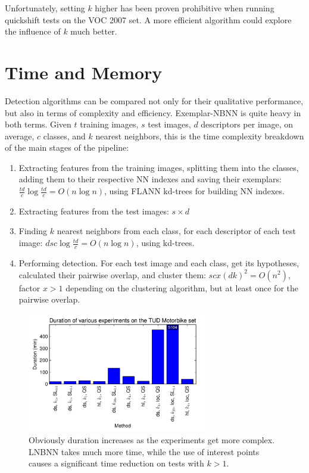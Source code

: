 Unfortunately, setting $k$ higher has been proven prohibitive when running quickshift tests on the VOC 2007 set. A more efficient algorithm could explore the influence of $k$ much better.


\section{Time and Memory} %
\label{sub:time_and_memory_constraints}

Detection algorithms can be compared not only for their qualitative performance, but also in terms of complexity and efficiency. Exemplar-NBNN is quite heavy in both terms. Given $t$ training images, $s$ test images, $d$ descriptors per image, on average, $c$ classes, and $k$ nearest neighbors, this is the time complexity breakdown of the main stages of the pipeline:
\begin{enumerate}
    \item Extracting features from the training images, splitting them into the classes, adding them to their respective NN indexes and saving their exemplars: $\frac{td}{c} \log \frac{td}{c} = O(n\log n)$, using FLANN kd-trees for building NN indexes.
    \item Extracting features from the test images: $s\times d$
    \item Finding $k$ nearest neighbors from each class, for each descriptor of each test image: $d s c \log \frac{td}{c} = O(n \log n)$, using kd-trees.
    \item Performing detection. For each test image and each class, get its hypotheses, calculated their pairwise overlap, and cluster them: $s c x (d k)^2 = O(n^2)$, factor $x>1$ depending on the clustering algorithm, but at least once for the pairwise overlap.
\end{enumerate}

\begin{figure}[hbt]
    \centering
    \includegraphics[width=0.7\textwidth]{DurTUD}
    \caption{Obviously duration increases as the experiments get more complex. LNBNN takes much more time, while the use of interest points causes a significant time reduction on tests with $k>1$.}
    \label{fig:durationTUD}
\end{figure}

